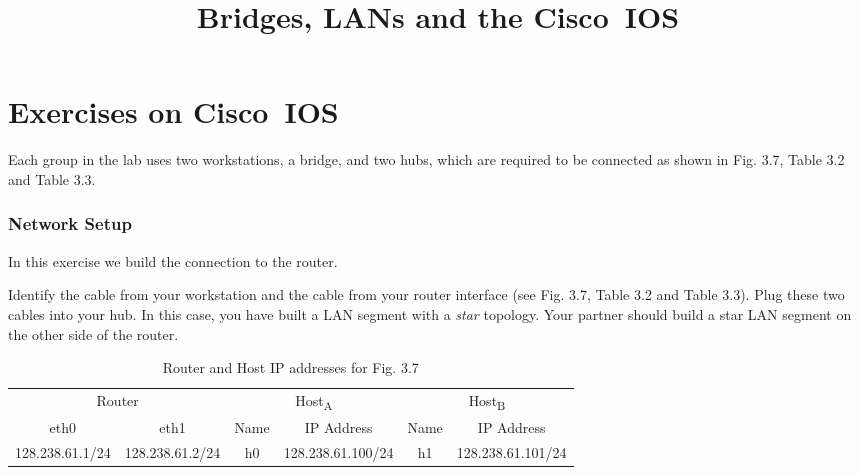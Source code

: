 \documentclass{../UTNetLab}
\title{Bridges, LANs and the Cisco~IOS}
\begin{document}
\part{Exercises on Cisco~IOS}
    Each group in the lab uses two workstations, a bridge, and two hubs, which are required to be connected as shown in Fig. 3.7, Table 3.2 and Table 3.3.

\section{Network Setup}
    In this exercise we build the connection to the router.

    Identify the cable from your workstation and the cable from your router interface (see Fig. 3.7, Table 3.2 and Table 3.3).
    Plug these two cables into your hub.
    In this case, you have built a LAN segment with a \textit{star} topology.
    Your partner should build a star LAN segment on the other side of the router.

    \begin{table}[H]
        \caption{Router and Host IP addresses for Fig. 3.7}
        \centering
        \begin{tabular}{ *2c|*2c|*2c }
            \hline \hline
            \multicolumn{2}{c|}{Router} & \multicolumn{2}{c|}{Host\textsubscript{A}} & \multicolumn{2}{c}{Host\textsubscript{B}} \\
            eth0 & eth1 & Name & IP Address & Name & IP Address \\
            \hline 
            128.238.61.1/24 & 128.238.61.2/24 & h0 & 128.238.61.100/24 & h1 & 128.238.61.101/24 \\
            \hline \hline
            \end{tabular}
    \end{table}
\end{document}
